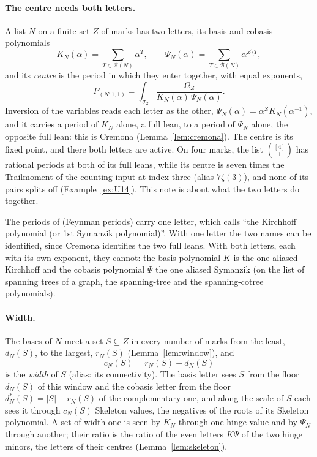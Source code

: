 \documentclass[11pt]{article}
\theoremstyle{plain}
\theoremstyle{definition}
\theoremstyle{remark}
\newcommand{\cB}{\mathcal B}
\begin{document}
\paragraph{The centre needs both letters.} A list $N$ on a finite set $Z$ of marks has two letters, its basis and cobasis polynomials
\[
K_N(\alpha)=\sum_{T\in\cB(N)}\alpha^T,\qquad \Psi_N(\alpha)=\sum_{T\in\cB(N)}\alpha^{Z\setminus T},
\]
and its \emph{centre} is the period in which they enter together, with equal exponents,
\[
P_{(N;1,1)}=\int_{\sigma_Z}\frac{\Omega_Z}{K_N(\alpha)\,\Psi_N(\alpha)} .
\]
Inversion of the variables reads each letter as the other, $\Psi_N(\alpha)=\alpha^ZK_N(\alpha^{-1})$, and it carries a period of $K_N$ alone, a full lean, to a period of $\Psi_N$ alone, the opposite full lean: this is Cremona (Lemma~\ref{lem:cremona}). The centre is its fixed point, and there both letters are active. On four marks, the list $\binom{[4]}1$ has rational periods at both of its full leans, while its centre is seven times the Trailmoment of the counting input at index three (alias $7\zeta(3)$), and none of its pairs splits off (Example~\ref{ex:U14}). This note is about what the two letters do together.

The periods of \cite{B2} (Feynman periods) carry one letter, which \cite[Def.~1.3]{B2} calls ``the Kirchhoff polynomial (or 1st Symanzik polynomial)''. With one letter the two names can be identified, since Cremona identifies the two full leans. With both letters, each with its own exponent, they cannot: the basis polynomial $K$ is the one aliased Kirchhoff and the cobasis polynomial $\Psi$ the one aliased Symanzik (on the list of spanning trees of a graph, the spanning-tree and the spanning-cotree polynomials).

\paragraph{Width.} The bases of $N$ meet a set $S\subseteq Z$ in every number of marks from the least, $d_N(S)$, to the largest, $r_N(S)$ (Lemma~\ref{lem:window}), and
\[
c_N(S)=r_N(S)-d_N(S)
\]
is the \emph{width} of $S$ (alias: its connectivity). The basis letter sees $S$ from the floor $d_N(S)$ of this window and the cobasis letter from the floor $d^\ast_N(S)=|S|-r_N(S)$ of the complementary one, and along the scale of $S$ each sees it through $c_N(S)$ Skeleton values, the negatives of the roots of its Skeleton polynomial. A set of width one is seen by $K_N$ through one hinge value and by $\Psi_N$ through another; their ratio is the ratio of the even letters $K\Psi$ of the two hinge minors, the letters of their centres (Lemma~\ref{lem:skeleton}).
\end{document}

